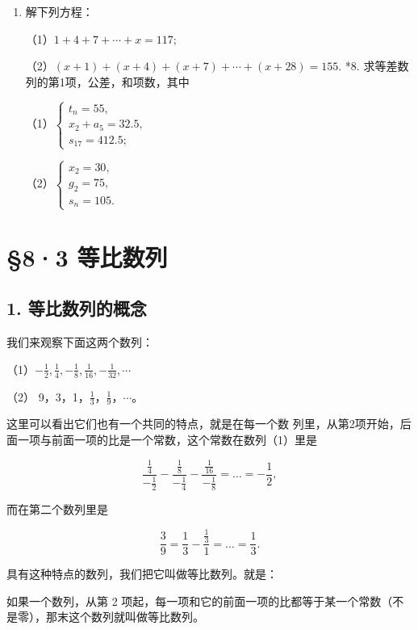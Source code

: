 \begin{enumerate}[start=7,label={*\arabic*.}]
\item
  解下列方程：

（1）\(1 + 4 + 7 + \cdots + x = 117;\)

（2）\((x + 1) + (x + 4) + (x + 7) + \cdots + (x + 28) = 155.\) *8.
求等差数列的第1项，公差，和项数，其中

（1）\(\left\{ \begin{array}{l} t_{n} = 55, \\ x_{2} + a_{5} = 32.5, \\ s_{17} = 412.5; \end{array} \right.\)

（2）\(\left\{ \begin{array}{l} x_{2} = 30, \\ g_{2} = 75, \\ s_{n} = 105. \end{array} \right.\)

\end{enumerate}
\section{§8·3 等比数列}

\subsection{1. 等比数列的概念}

我们来观察下面这两个数列：

（1）\(-\frac{1}{2}, \frac{1}{4}, -\frac{1}{8}, \frac{1}{16}, -\frac{1}{32}, \cdots\)

（2） 9，3，1，\(\frac{1}{3}\)，\(\frac{1}{9}\)，\(\cdots\)。

这里可以看出它们也有一个共同的特点，就是在每一个数
列里，从第2项开始，后面一项与前面一项的比是一个常数，这个常数在数列（1）里是

\[
\frac{\frac{1}{4}}{- \frac{1}{2}} - \frac{\frac{1}{8}}{- \frac{1}{4}} - \frac{\frac{1}{16}}{- \frac{1}{8}} = \dots = - \frac{1}{2},
\]

而在第二个数列里是

\[
\frac{3}{9} = \frac{1}{3} - \frac{\frac{1}{3}}{1} = \dots = \frac{1}{3}.
\]

具有这种特点的数列，我们把它叫做等比数列。就是：

如果一个数列，从第 2
项起，每一项和它的前面一项的比都等于某一个常数（不是零），那末这个数列就叫做等比数列。

